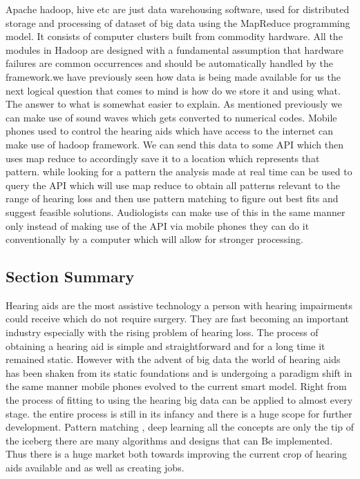 \documentclass[sigconf]{acmart}
\begin{document}
Apache hadoop, hive etc are just data warehousing software, used for distributed storage and processing of dataset of big data using the MapReduce programming model. It consists of computer clusters built from commodity hardware. All the modules in Hadoop are designed with a fundamental assumption that hardware failures are common occurrences and should be automatically handled by the framework.we have previously seen how data is being made available for us the next logical question that comes to mind is how do we store it and using what. The answer to what is somewhat easier to explain. As mentioned previously we can make use of sound waves which gets converted to numerical codes. Mobile phones used to control the hearing aids which have access to the internet can make use of hadoop framework. We can send this data to some API which then uses map reduce to accordingly save it to a location which represents that pattern. while looking for a pattern the analysis made at real time can be used to query the API which will use map reduce to obtain all patterns relevant to the range of hearing loss and then use pattern matching to figure out best fits and suggest feasible solutions. Audiologists can make use of this in the same manner only instead of making use of the API via mobile phones they can do it conventionally by a computer which will allow for stronger processing.


\subsection{Section Summary}

Hearing aids are the most assistive technology a person with hearing impairments could receive which do not require surgery. They are fast becoming an important industry especially with the rising problem of hearing loss. The process of obtaining a hearing aid is simple and straightforward and for a long time it remained static. However with the advent of big data the world of hearing aids has been shaken from its static foundations and is undergoing a paradigm shift in the same manner mobile phones evolved to the current smart model. Right from the process of fitting to using the hearing big data can be applied to almost every stage. the entire process is still in its infancy and there is a huge scope for further development. Pattern matching , deep learning all the concepts are only the tip of the iceberg there are many algorithms and designs that can Be implemented. Thus there is a huge market both towards improving the current crop of hearing aids available and as well as creating jobs.
\end{document}
